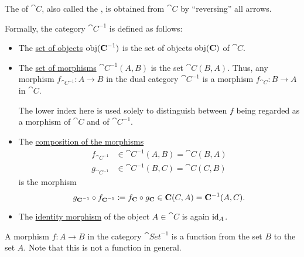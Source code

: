 \begin{definition}\label{def:dual_category}
  The  of \( \cat{C} \), also called the , is obtained from \( \cat{C} \) by \enquote{reversing} all arrows.

  Formally, the category \( \cat{C}^{-1} \) is defined as follows:
  \begin{itemize}
    \item The \hyperref[def:category/objects]{set of objects} \( \operatorname{obj}(\operatorname{\mathbf{C}}^{-1}) \) is the set of objects \( \operatorname{obj}(\operatorname{\mathbf{C}}) \) of \( \cat{C} \).

    \item The \hyperref[def:category/morphisms]{set of morphisms} \( \cat{C}^{-1}(A, B) \) is the set \( \cat{C}(B, A) \). Thus, any morphism \( f_{\cat{C}^{-1}}: A \to B \) in the dual category \( \cat{C}^{-1} \) is a morphism \( f_{\cat{C}}: B \to A \) in \( \cat{C} \).

    The lower index here is used solely to distinguish between \( f \) being regarded as a morphism of \( \cat{C} \) and of \( \cat{C}^{-1} \).

    \item The \hyperref[def:category/composition]{composition of the morphisms}
    \begin{align*}
      f_{\cat{C}^{-1}} &\in \cat{C}^{-1}(A, B) = \cat{C}(B, A) \\
      g_{\cat{C}^{-1}} &\in \cat{C}^{-1}(B, C) = \cat{C}(C, B)
    \end{align*}
    is the morphism
    \begin{equation*}
      g_{\operatorname{\mathbf{C}}^{-1}} \mathbin \circ f_{\operatorname{\mathbf{C}}^{-1}} \coloneqq f_{\operatorname{\mathbf{C}}} \mathbin \circ g_{\operatorname{\mathbf{C}}} \in \operatorname{\mathbf{C}}(C, A) = \operatorname{\mathbf{C}}^{-1}(A, C).
    \end{equation*}

    \item The \hyperref[def:category/identity]{identity morphism} of the object \( A \in \cat{C} \) is again \( \operatorname{id}_A \).
  \end{itemize}
\end{definition}

\begin{example}\label{ex:def:dual_category}
  A morphism \( f: A \to B \) in the category \( \cat{Set}^{-1} \) is a function from the set \( B \) to the set \( A \). Note that this is not a function in general.
\end{example}

